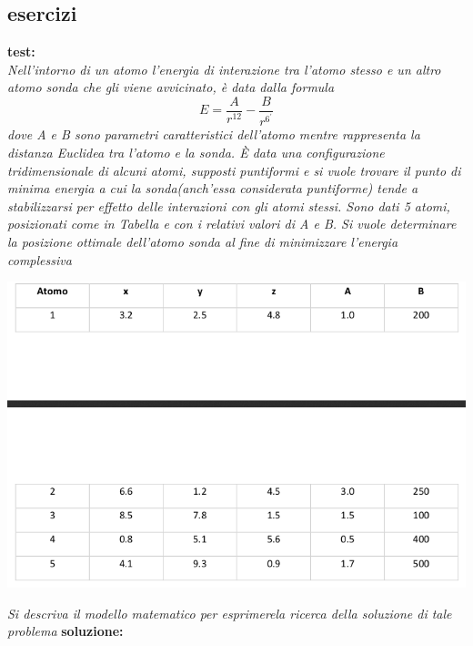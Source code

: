 \documentclass[a4paper,12pt, oneside]{book}
\begin{document}
\subsection{esercizi}
\begin{esempio}
  \textbf{test:}\\
  \textit{Nell’intorno di un atomo l’energia di interazione tra
    l’atomo stesso e un altro atomo sonda che gli viene avvicinato, è
    data dalla formula}
  \[E=\frac{A}{r^{12}}-\frac{B}{r^{6^{'}}}\]
  \textit{dove A e B sono parametri caratteristici dell’atomo mentre
    rappresenta la distanza Euclidea tra l’atomo e la sonda. È data
    una  configurazione  tridimensionale  di  alcuni  atomi,  supposti
    puntiformi  e  si  vuole  trovare  il  punto  di  minima energia
    a  cui  la  sonda(anch’essa considerata puntiforme) tende a
    stabilizzarsi per  effetto  delle  interazioni  con  gli atomi
    stessi. Sono  dati  5  atomi,  posizionati  come  in  Tabella
    e  con  i  relativi  valori  di  A  e  B.  Si  vuole  determinare
    la posizione ottimale dell’atomo sonda al fine di minimizzare
    l’energia complessiva}
  \begin{center}
    \includegraphics[scale = 0.7]{img/es.png}
  \end{center}
  \textit{Si descriva il modello matematico per esprimerela ricerca
    della soluzione di tale problema}
  \textbf{soluzione:}\\
  
\end{esempio}
\end{document}
